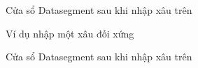 \documentclass[a4paper,12pt]{article}
\begin{document}
\begin{figure}[!h]
	\centerline{}
	\caption{Cửa sổ Datasegment sau khi nhập xâu trên}
	\label{fig:bai6}
\end{figure}
\begin{figure}[!h]
	\centerline{}
	\caption{Ví dụ nhập một xâu đối xứng}
	\label{fig:bai6}
\end{figure}
\begin{figure}[!h]
	\centerline{}
	\caption{Cửa sổ Datasegment sau khi nhập xâu trên}
	\label{fig:bai6}
\end{figure}
\clearpage
\end{document}
